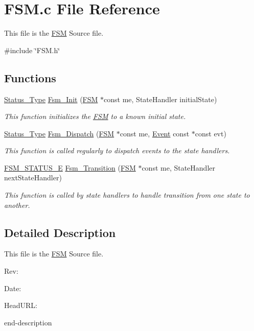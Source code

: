 \section{FSM.c File Reference}
\label{_f_s_m_8c}


This file is the \hyperlink{struct_f_s_m}{FSM} Source file.  


{\ttfamily \#include \char`\"{}FSM.h\char`\"{}}\par
\subsection*{Functions}
\begin{DoxyCompactItemize}
\item 
\hyperlink{group___f_s_m_ga3ef97600b5131dbf1b9a798e760e9268}{Status\_\-Type} \hyperlink{group___f_s_m_ga642a33b2ed914211fa65a9a802217532}{Fsm\_\-Init} (\hyperlink{struct_f_s_m}{FSM} $\ast$const me, StateHandler initialState)
\begin{DoxyCompactList}\small\item\em This function initializes the \hyperlink{struct_f_s_m}{FSM} to a known initial state. \end{DoxyCompactList}\item 
\hyperlink{group___f_s_m_ga3ef97600b5131dbf1b9a798e760e9268}{Status\_\-Type} \hyperlink{group___f_s_m_gaa985b514837a40bd2ab5bfb558c430e1}{Fsm\_\-Dispatch} (\hyperlink{struct_f_s_m}{FSM} $\ast$const me, \hyperlink{struct_event}{Event} const $\ast$const evt)
\begin{DoxyCompactList}\small\item\em This function is called regularly to dispatch events to the state handlers. \end{DoxyCompactList}\item 
\hyperlink{group___f_s_m_ga64d3de8a4121adac058d8a5e116d9b7d}{FSM\_\-STATUS\_\-E} \hyperlink{group___f_s_m_gac25b316d591ebf1763aeed9ab0eaae58}{Fsm\_\-Transition} (\hyperlink{struct_f_s_m}{FSM} $\ast$const me, StateHandler nextStateHandler)
\begin{DoxyCompactList}\small\item\em This function is called by state handlers to handle transition from one state to another. \end{DoxyCompactList}\end{DoxyCompactItemize}


\subsection{Detailed Description}
This file is the \hyperlink{struct_f_s_m}{FSM} Source file. \begin{DoxyParagraph}{Rev:}

\end{DoxyParagraph}
\begin{DoxyParagraph}{Date:}

\end{DoxyParagraph}
\begin{DoxyParagraph}{HeadURL:}

\end{DoxyParagraph}


end-\/description 